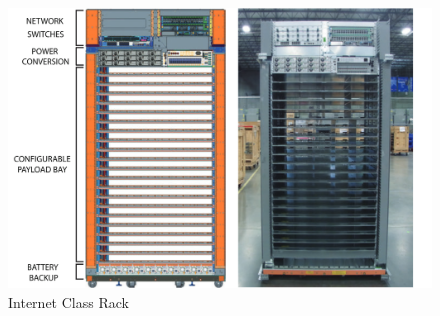 \begin{figure} [!h]
\centering
\includegraphics[scale=.5]{methodology/images/goog_rack.png}
\caption[Example Hyper Scale]{Internet Class Rack \cite{barroso18}}
\label{goog_rack}
\end{figure}
